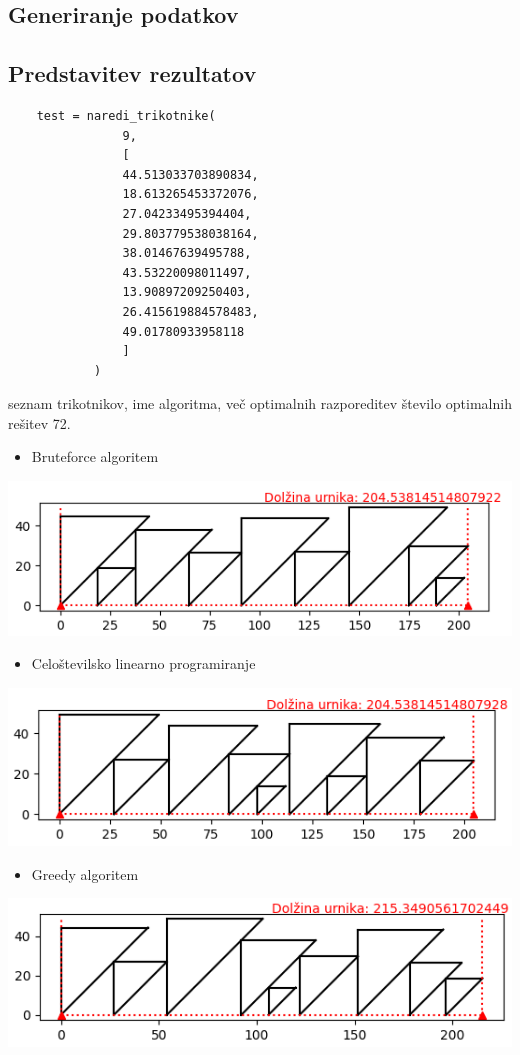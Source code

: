 \documentclass[a4paper,12pt]{article}
\theoremstyle{definition}
\theoremstyle{plain}
\begin{document}
\subsection{Generiranje podatkov}

\subsection{Predstavitev rezultatov}
\begin{verbatim}
    test = naredi_trikotnike(
                9,
                [ 
                44.513033703890834,
                18.613265453372076,
                27.04233495394404,
                29.803779538038164,
                38.01467639495788,
                43.53220098011497,
                13.90897209250403,
                26.415619884578483,
                49.01780933958118
                ]
            )
\end{verbatim}

seznam trikotnikov, ime algoritma, več optimalnih razporeditev 
število optimalnih rešitev 72. \\

\begin{itemize}
    \item Bruteforce algoritem
\end{itemize}    
    \includegraphics[]{sim_brut.png}
    \begin{itemize}
    \item Celoštevilsko linearno programiranje
\end{itemize}    
    \includegraphics[]{sim_clp.png}
    \begin{itemize}
    \item Greedy algoritem
\end{itemize}    
    \includegraphics[]{sim_greedy.png}
\end{document}

